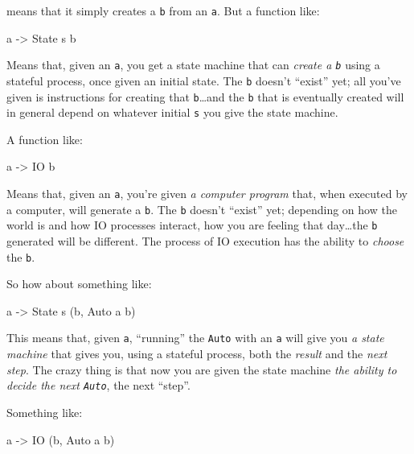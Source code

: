 \documentclass[]{article}
\newenvironment{Shaded}{}{}
\newcommand{\DataTypeTok}[1]{\textcolor[rgb]{0.56,0.13,0.00}{{#1}}}
\newcommand{\OtherTok}[1]{\textcolor[rgb]{0.00,0.44,0.13}{{#1}}}
\newcommand{\NormalTok}[1]{{#1}}
\begin{document}
means that it simply creates a \texttt{b} from an \texttt{a}. But a
function like:

\begin{Shaded}
\begin{Highlighting}[]
\NormalTok{a }\OtherTok{->} \DataTypeTok{State} \NormalTok{s b}
\end{Highlighting}
\end{Shaded}

Means that, given an \texttt{a}, you get a state machine that can
\emph{create a \texttt{b}} using a stateful process, once given an
initial state. The \texttt{b} doesn't ``exist'' yet; all you've given is
instructions for creating that \texttt{b}\ldots{}and the \texttt{b} that
is eventually created will in general depend on whatever initial
\texttt{s} you give the state machine.

A function like:

\begin{Shaded}
\begin{Highlighting}[]
\NormalTok{a }\OtherTok{->} \DataTypeTok{IO} \NormalTok{b}
\end{Highlighting}
\end{Shaded}

Means that, given an \texttt{a}, you're given \emph{a computer program}
that, when executed by a computer, will generate a \texttt{b}. The
\texttt{b} doesn't ``exist'' yet; depending on how the world is and how
IO processes interact, how you are feeling that day\ldots{}the
\texttt{b} generated will be different. The process of IO execution has
the ability to \emph{choose} the \texttt{b}.

So how about something like:

\begin{Shaded}
\begin{Highlighting}[]
\NormalTok{a }\OtherTok{->} \DataTypeTok{State} \NormalTok{s (b, }\DataTypeTok{Auto} \NormalTok{a b)}
\end{Highlighting}
\end{Shaded}

This means that, given \texttt{a}, ``running'' the \texttt{Auto} with an
\texttt{a} will give you \emph{a state machine} that gives you, using a
stateful process, both the \emph{result} and the \emph{next step}. The
crazy thing is that now you are given the state machine \emph{the
ability to decide the next \texttt{Auto}}, the next ``step''.

Something like:

\begin{Shaded}
\begin{Highlighting}[]
\NormalTok{a }\OtherTok{->} \DataTypeTok{IO} \NormalTok{(b, }\DataTypeTok{Auto} \NormalTok{a b)}
\end{Highlighting}
\end{Shaded}
\end{document}
